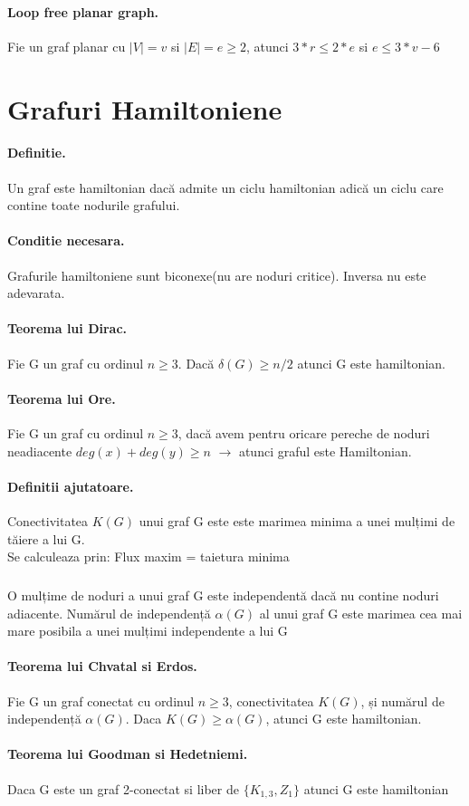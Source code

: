 \documentclass{article}
\begin{document}
\paragraph*{Loop free planar graph.} Fie un graf planar cu $|V|=v$ si $|E|=e \ge 2$, atunci  $3*r \leq 2*e$ si $e \leq 3*v-6$

\section{Grafuri Hamiltoniene}
\paragraph*{Definitie.} Un graf este hamiltonian dacă admite un ciclu hamiltonian adică un ciclu care contine toate nodurile grafului.
\paragraph*{Conditie necesara.} Grafurile hamiltoniene sunt biconexe(nu are noduri critice). Inversa nu este adevarata.
\paragraph*{Teorema lui Dirac.} Fie G un graf cu ordinul $n \geq 3$. Dacă $\delta (G) \geq n/2$ atunci G este hamiltonian.

\paragraph*{Teorema lui Ore.} Fie G un graf cu ordinul $n \geq 3$, dacă avem pentru oricare pereche de noduri neadiacente $deg(x) + deg(y) \geq n$ $\rightarrow$ atunci graful este Hamiltonian.

\paragraph*{Definitii ajutatoare.} Conectivitatea $K(G)$ unui graf G este este marimea minima a unei mulțimi de tăiere a lui G.\\
Se calculeaza prin: Flux maxim = taietura minima
\subparagraph*{} O mulțime de noduri a unui graf G este independentă dacă nu contine
noduri adiacente. Numărul de independență $\alpha (G)$ al unui graf G este marimea cea mai mare posibila a unei mulțimi independente a lui G

\paragraph*{Teorema lui Chvatal si Erdos.} Fie G un graf conectat cu ordinul $n \geq 3$, conectivitatea $K(G)$, și numărul de independență $\alpha(G)$. Daca $K(G) \geq \alpha(G)$, atunci G este hamiltonian.

\paragraph*{Teorema lui Goodman si Hedetniemi.} Daca G este un graf 2-conectat si liber de $\{K_{1,3}, Z_1\}$ atunci G este hamiltonian
\end{document}
